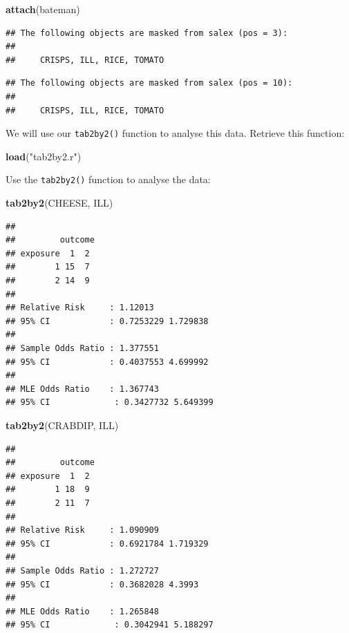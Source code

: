 \documentclass[]{book}
\newenvironment{Shaded}{\begin{snugshade}}{\end{snugshade}}
\newcommand{\KeywordTok}[1]{\textcolor[rgb]{0.13,0.29,0.53}{\textbf{#1}}}
\newcommand{\StringTok}[1]{\textcolor[rgb]{0.31,0.60,0.02}{#1}}
\newcommand{\NormalTok}[1]{#1}
\theoremstyle{definition}
\theoremstyle{definition}
\theoremstyle{definition}
\theoremstyle{remark}
\begin{document}
\begin{Shaded}
\begin{Highlighting}[]
\KeywordTok{attach}\NormalTok{(bateman)}
\end{Highlighting}
\end{Shaded}

\begin{verbatim}
## The following objects are masked from salex (pos = 3):
## 
##     CRISPS, ILL, RICE, TOMATO
\end{verbatim}

\begin{verbatim}
## The following objects are masked from salex (pos = 10):
## 
##     CRISPS, ILL, RICE, TOMATO
\end{verbatim}

We will use our \texttt{tab2by2()} function to analyse this data.
Retrieve this function:

\begin{Shaded}
\begin{Highlighting}[]
\KeywordTok{load}\NormalTok{(}\StringTok{"tab2by2.r"}\NormalTok{)}
\end{Highlighting}
\end{Shaded}

Use the \texttt{tab2by2()} function to analyse the data:

\begin{Shaded}
\begin{Highlighting}[]
\KeywordTok{tab2by2}\NormalTok{(CHEESE, ILL)}
\end{Highlighting}
\end{Shaded}

\begin{verbatim}
## 
##         outcome
## exposure  1  2
##        1 15  7
##        2 14  9
## 
## Relative Risk     : 1.12013 
## 95% CI            : 0.7253229 1.729838 
## 
## Sample Odds Ratio : 1.377551 
## 95% CI            : 0.4037553 4.699992 
## 
## MLE Odds Ratio    : 1.367743 
## 95% CI             : 0.3427732 5.649399
\end{verbatim}

\begin{Shaded}
\begin{Highlighting}[]
\KeywordTok{tab2by2}\NormalTok{(CRABDIP, ILL)}
\end{Highlighting}
\end{Shaded}

\begin{verbatim}
## 
##         outcome
## exposure  1  2
##        1 18  9
##        2 11  7
## 
## Relative Risk     : 1.090909 
## 95% CI            : 0.6921784 1.719329 
## 
## Sample Odds Ratio : 1.272727 
## 95% CI            : 0.3682028 4.3993 
## 
## MLE Odds Ratio    : 1.265848 
## 95% CI             : 0.3042941 5.188297
\end{verbatim}
\end{document}
